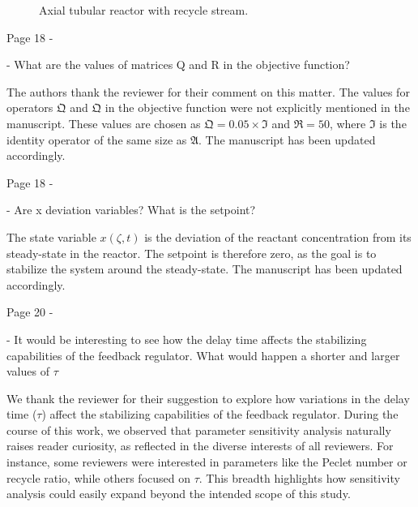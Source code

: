 \documentclass[12pt,answers]{exam}
\begin{document}
\begin{questions}
\begin{figure}[!htbp]
\begin{tikzpicture}
        \end{tikzpicture}
        \caption{Axial tubular reactor with recycle stream.}
        \label{fig:reactor}
    \end{figure}

    \question Page 18 - 

    - What are the values of matrices Q and R in the objective function?

    \begin{solutionorbox} \label{comment:1_12}
        The authors thank the reviewer for their comment on this matter. The values for operators $\mathfrak{Q}$ and $\mathfrak{Q}$ in the objective function were not explicitly mentioned in the manuscript. These values are chosen as $\mathfrak{Q} = 0.05 \times \mathfrak{I}$ and $\mathfrak{R} = 50$, where $\mathfrak{I}$ is the identity operator of the same size as $\mathfrak{A}$. The manuscript has been updated accordingly.
    \end{solutionorbox}


    \question Page 18 - 

    - Are x deviation variables? What is the setpoint?

    \begin{solutionorbox} \label{comment:1_13}
        The state variable $x(\zeta,t)$ is the deviation of the reactant concentration from its steady-state in the reactor. The setpoint is therefore zero, as the goal is to stabilize the system around the steady-state. The manuscript has been updated accordingly.
    \end{solutionorbox}


    \question Page 20 - 

    - It would be interesting to see how the delay time affects the stabilizing capabilities of the feedback regulator. What would happen a shorter and larger values of $\tau$

    \begin{solutionorbox} \label{comment:1_14}
        We thank the reviewer for their suggestion to explore how variations in the delay time (\(\tau\)) affect the stabilizing capabilities of the feedback regulator. During the course of this work, we observed that parameter sensitivity analysis naturally raises reader curiosity, as reflected in the diverse interests of all reviewers. For instance, some reviewers were interested in parameters like the Peclet number or recycle ratio, while others focused on \(\tau\). This breadth highlights how sensitivity analysis could easily expand beyond the intended scope of this study.


\end{solutionorbox}
\end{questions}
\end{document}
